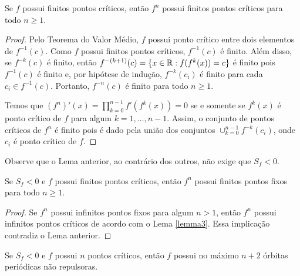 \begin{lemma}
Se $f$ possui finitos pontos críticos, então $f^n$ possui finitos pontos críticos para todo $n \geq 1$.
\end{lemma}
\begin{proof}

Pelo Teorema do Valor Médio, $f$ possui ponto crítico entre dois elementos de $f^{-1}(c)$. Como $f$ possui finitos pontos críticos, $f^{-1}(c)$ é finito. Além disso, se $f^{-k}(c)$ é finito, então $f^{-(k+1)}(c) = \{ x \in \mathbb{R} : f(f^k(x)) = c \}$ é finito pois $f^{-1}(c)$ é finito e, por hipótese de indução, $f^{-k}(c_ i)$ é finito para cada $c_i \in f^{-1}(c)$. Portanto, $f^{-n}(c)$ é finito para todo $n \geq 1$.

Temos que $(f^n)'(x) = \prod_{k=0}^{n-1} f'(f^k(x)) = 0$ se e somente se $f^k(x)$ é ponto crítico de $f$ para algum $k = 1, \dots, n-1$. Assim, o conjunto de pontos críticos de $f^n$ é finito pois é dado pela união dos conjuntos $\cup_{k=0}^{n-1} f^{-k}(c_i)$, onde $c_i$ é ponto crítico de $f$.
\end{proof}

Observe que o Lema anterior, ao contrário dos outros, não exige que $S_f < 0$.

\begin{lemma}
Se $S_f < 0$ e $f$ possui finitos pontos críticos, então $f^n$ possui finitos pontos fixos para todo $n \geq 1$.
\end{lemma}
\begin{proof}
Se $f^n$ possui infinitos pontos fixos para algum $n > 1$, então $f^n$ possui infinitos pontos críticos de acordo com o Lema \ref{lemma3}. Essa implicação contradiz o Lema anterior.%
\end{proof}


\begin{theorem}[Singer]
Se $S_f < 0$ e $f$ possui $n$ pontos críticos, então $f$ possui no máximo $n+2$ órbitas periódicas não repulsoras.
\end{theorem}

